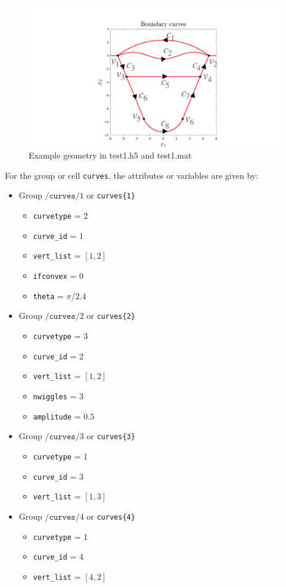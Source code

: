 \documentclass[11pt]{article}
\theoremstyle{definition}
\theoremstyle{remark}
\numberwithin{equation}{section}
\begin{document}
\begin{figure}[h!]
\begin{center}
\includegraphics[width=0.5\linewidth]{example_geom}
\caption{Example geometry in test1.h5 and test1.mat}
\end{center}
\label{fig:1}
\end{figure}


For the group or cell \texttt{curves}, the attributes or variables are given by:
\begin{itemize}
\item Group $/\texttt{curves}/1$ or \texttt{curves\{1\}}
\begin{itemize}
\item \texttt{curvetype} = 2
\item \texttt{curve\_id} = 1
\item \texttt{vert\_list} = $[1,2]$
\item \texttt{ifconvex} = 0
\item \texttt{theta} = $\pi/2.4$
\end{itemize}
\item Group $/\texttt{curves}/2$ or \texttt{curves\{2\}}
\begin{itemize}
\item \texttt{curvetype} = 3
\item \texttt{curve\_id} = 2
\item \texttt{vert\_list} = $[1,2]$
\item \texttt{nwiggles} = 3
\item \texttt{amplitude} = $0.5$
\end{itemize}
\item Group $/\texttt{curves}/3$ or \texttt{curves\{3\}}
\begin{itemize}
\item \texttt{curvetype} = 1
\item \texttt{curve\_id} = 3
\item \texttt{vert\_list} = $[1,3]$
\end{itemize}
\item Group $/\texttt{curves}/4$ or \texttt{curves\{4\}}
\begin{itemize}
\item \texttt{curvetype} = 1
\item \texttt{curve\_id} = 4
\item \texttt{vert\_list} = $[4,2]$
\end{itemize}


\end{itemize}
\end{document}
